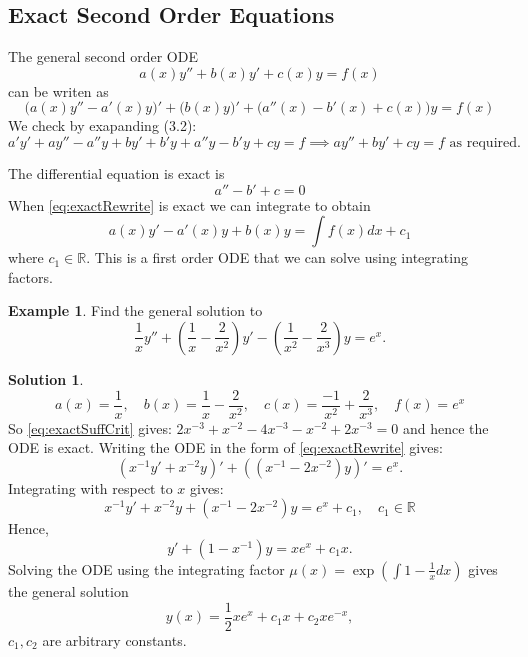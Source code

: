 \documentclass{article}
\theoremstyle{plain}
\theoremstyle{definition}
\newtheorem{exmp}{Example}[section]
\newtheorem*{sol}{Solution}
\numberwithin{equation}{section}
\begin{document}
\subsection{Exact Second Order Equations}

The general second order ODE
\begin{equation}\label{eq:generalLinear}
    a(x)y'' + b(x)y' + c(x)y = f(x)
\end{equation}
can be writen as
\begin{equation}\label{eq:exactRewrite}
    \big( a(x)y'' - a'(x)y\big)' + \big(b(x)y\big)' + \big(a''(x) - b'(x) + c(x)\big)y = f(x)
\end{equation}
We check by exapanding (3.2):
\[ a'y'+ay'' - a''y + by' + b'y + a''y - b'y + cy = f  \implies ay'' + by' + cy = f \text{ as required.}\]

The differential equation is exact is
\begin{equation}\label{eq:exactSuffCrit}
    a''-b'+c = 0
\end{equation}
When \eqref{eq:exactRewrite} is exact we can integrate to obtain
\[ a(x)y' - a'(x)y + b(x) y = \int f(x) dx + c_1 \]
where $c_1 \in \mathbb{R}$. This is a first order ODE that we can solve using integrating factors.

\begin{tcolorbox}
    \begin{exmp}
        Find the general solution to
        \[
            \frac{1}{x}y'' + \left( \frac{1}{x} - \frac{2}{x^2}\right)y' - \left(\frac{1}{x^2} - \frac{2}{x^3}\right)y = e^x.
        \]
    \end{exmp}
    \begin{sol}
        \[a(x) = \frac{1}{x}, \quad b(x) = \frac{1}{x} - \frac{2}{x^2},\quad c(x) = \frac{-1}{x^2} + \frac{2}{x^3},\quad f(x)=e^x \]
        So \eqref{eq:exactSuffCrit} gives: $2x^{-3} + x^{-2} - 4x^{-3} - x^{-2} + 2x^{-3} = 0$ and hence the ODE is exact. Writing the ODE in the form of \eqref{eq:exactRewrite} gives:
        \[ \left(x^{-1}y' + x^{-2}y\right)' + \left(\left(x^{-1}-2x^{-2}\right)y\right)' = e^x. \]
        Integrating with respect to $x$ gives:
        \[ x^{-1}y' + x^{-2}y + (x^{-1}-2x^{-2})y = e^x + c_1, \quad c_1 \in \mathbb{R} \]
        Hence,
        \[ y' + (1-x^{-1})y = xe^x + c_1x. \]
        Solving the ODE using the integrating factor $\mu(x) = \exp\left( \int 1-\frac{1}{x} dx \right) $ gives the general solution
        \[ y(x) = \frac{1}{2}xe^x + c_1x + c_2xe^{-x}, \]
        $c_1,c_2$ are arbitrary constants.
    \end{sol}
\end{tcolorbox}
\end{document}
